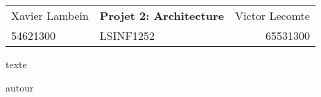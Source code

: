 \documentclass[a4paper,10pt]{article}
\begin{document}
\begin{center}
\begin{tabu} to \textwidth {lX[c]r}
    Xavier Lambein & \large{\textbf{Projet 2: Architecture}} & Victor Lecomte \\
    54621300 & LSINF1252 & 65531300 \\
    \hline
\end{tabu}
\end{center}

texte



autour
\end{document}
